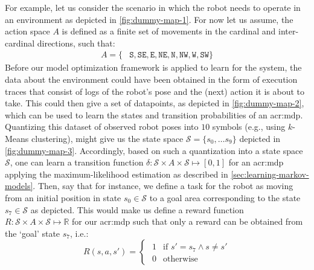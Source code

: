 For example, let us consider the scenario in which the robot needs to operate in an environment as depicted in \autoref{fig:dummy-map-1}.
For now let us assume, the action space $A$ is defined as a finite set of movements in the cardinal and inter-cardinal directions, such that: 
\begin{align*}
	A = \{&\texttt{S}, \texttt{SE}, \texttt{E}, \texttt{NE},
		  \texttt{N}, \texttt{NW}, \texttt{W}, \texttt{SW}  \}
\end{align*}\newpage
Before our model optimization framework is applied to learn  for the system, the data about the environment could have been obtained in the form of execution traces that consist of logs of the robot's pose and the (next) action it is about to take.
This could then give a set of datapoints, as depicted in \autoref{fig:dummy-map-2}, which can be used to learn the states and transition probabilities of an \acrshort{acr:mdp}.
Quantizing this dataset of observed robot poses into $10$ symbols (e.g., using $k$-Means clustering), might give us the state space $\mathcal{S} = \{s_0, \ldots s_9\}$ depicted in \autoref{fig:dummy-map-3}.
Accordingly, based on such a quantization into a state space $\mathcal{S}$, one can learn a transition function $\delta: \mathcal{S} \times A \times \mathcal{S} \mapsto [0, 1]$ for an \acrshort{acr:mdp} applying the maximum-likelihood estimation as described in \autoref{sec:learning-markov-models}.
Then, say that for instance, we define a task for the robot as moving from an initial position in state $s_0 \in \mathcal{S}$ to a goal area corresponding to the state $s_7 \in \mathcal{S}$ as depicted.
This would make us define a reward function $R: \mathcal{S} \times A \times \mathcal{S} \mapsto \mathbb{R}$ for our \acrshort{acr:mdp} such that only a reward can be obtained from the `goal' state $s_7$, i.e.:
\[
R(s, a, s') = 
\begin{cases}
\hspace{4pt} 	1 & \text{if } s' = s_7 \land s \neq s'\\
\hspace{4pt} 	0 & \text{otherwise}
\end{cases}
\]

